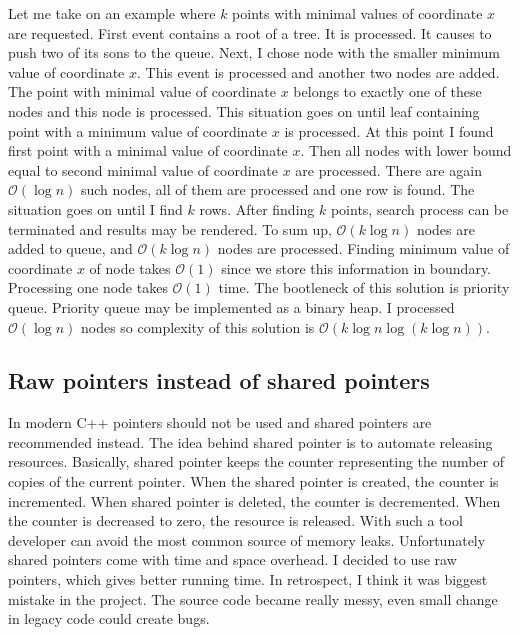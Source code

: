 \documentclass[10pt,a4paper]{article}
\newcommand{\Oh}{\mathcal{O}}
\begin{document}
Let me take on an example where $k$ points with minimal values of coordinate $x$ are requested. First event contains a root of a tree. It is processed. It causes to push two of its sons to the queue. Next, I chose node with the smaller minimum value of coordinate $x$. This event is processed and another two nodes are added. The point with minimal value of coordinate $x$ belongs to exactly one of these nodes and this node is processed. This situation goes on until leaf containing point with a minimum value of coordinate $x$ is processed. At this point I found first point with a minimal value of coordinate $x$. Then all nodes with lower bound equal to second minimal value of coordinate $x$ are processed. There are again $\Oh(\log n)$ such nodes, all of them are processed and one row is found. The situation goes on until I find $k$ rows.  After finding $k$ points, search process can be terminated and results may be rendered. To sum up, $\Oh(k \log n)$ nodes are added to queue, and $\Oh(k \log n)$ nodes are processed. Finding minimum value of coordinate $x$ of node takes $\Oh(1)$ since we store this information in boundary. Processing one node takes $\Oh(1)$ time. The bootleneck of this solution is priority queue. Priority queue may be implemented as a binary heap. I processed $\Oh(\log n)$ nodes so complexity of this solution is $\Oh(k \log n \log(k \log n))$.

\subsection{Raw pointers instead of shared pointers}

In modern C++ pointers should not be used and shared pointers are recommended instead. The idea behind shared pointer is to automate releasing resources. Basically, shared pointer keeps the counter representing the number of copies of the current pointer. When the shared pointer is created, the counter is incremented. When shared pointer is deleted, the counter is decremented. When the counter is decreased to zero, the resource is released. With such a tool developer can avoid the most common source of memory leaks. Unfortunately shared pointers come with time and space overhead. I decided to use raw pointers, which gives better running time. In retrospect, I think it was biggest mistake in the project. The source code became really messy, even small change in legacy code could create bugs.
\end{document}
